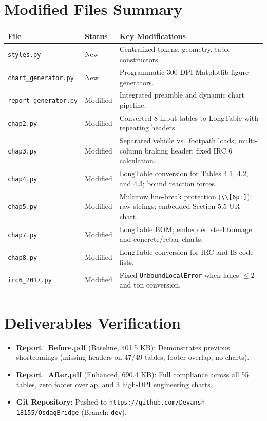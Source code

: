 \documentclass[11pt,a4paper]{article}
\begin{document}
\section{Modified Files Summary}
\begin{center}
\small
\begin{tabular}{|l|l|p{7.5cm}|}
\hline
\textbf{File} & \textbf{Status} & \textbf{Key Modifications} \\
\hline
\texttt{styles.py} & New & Centralized tokens, geometry, table constructors. \\
\texttt{chart\_generator.py} & New & Programmatic 300-DPI Matplotlib figure generators. \\
\texttt{report\_generator.py} & Modified & Integrated preamble and dynamic chart pipeline. \\
\texttt{chap2.py} & Modified & Converted 8 input tables to LongTable with repeating headers. \\
\texttt{chap3.py} & Modified & Separated vehicle vs.\ footpath loads; multi-column braking header; fixed IRC 6 calculation. \\
\texttt{chap4.py} & Modified & LongTable conversion for Tables 4.1, 4.2, and 4.3; bound reaction forces. \\
\texttt{chap5.py} & Modified & Multirow line-break protection (\texttt{\textbackslash\textbackslash*[6pt]}); raw strings; embedded Section 5.5 UR chart. \\
\texttt{chap7.py} & Modified & LongTable BOM; embedded steel tonnage and concrete/rebar charts. \\
\texttt{chap8.py} & Modified & LongTable conversion for IRC and IS code lists. \\
\texttt{irc6\_2017.py} & Modified & Fixed \texttt{UnboundLocalError} when lanes $\le 2$ and ton conversion. \\
\hline
\end{tabular}
\end{center}

\section{Deliverables Verification}
\begin{itemize}
    \item \textbf{Report\_Before.pdf} (Baseline, 401.5 KB): Demonstrates previous shortcomings (missing headers on 47/49 tables, footer overlap, no charts).
    \item \textbf{Report\_After.pdf} (Enhanced, 690.4 KB): Full compliance across all 55 tables, zero footer overlap, and 3 high-DPI engineering charts.
    \item \textbf{Git Repository}: Pushed to \texttt{https://github.com/Devansh-18155/OsdagBridge} (Branch: \texttt{dev}).
\end{itemize}
\end{document}
